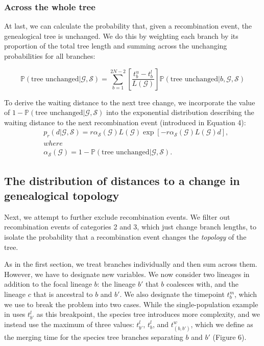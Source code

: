 \documentclass[11pt]{article}
\begin{document}
\subsubsection{Across the whole tree}

At last, we can calculate the probability that, given a recombination event, the genealogical tree is unchanged. We do this by weighting each branch by its proportion of the total tree length and summing across the unchanging probabilities for all branches:

\begin{equation}
	\mathbb{P}(\textrm{tree unchanged} | \mathcal{G},\mathcal{S}) = \sum_{b=1}^{2N-2}\left[\frac{t^u_b-t^l_b}{L(\mathcal{G})}\right]\mathbb{P}(\textrm{tree unchanged} | b,\mathcal{G},\mathcal{S})
\end{equation}

To derive the waiting distance to the next tree change, we incorporate the value of $1-\mathbb{P}(\textrm{tree unchanged} | \mathcal{G},\mathcal{S})$ into the exponential distribution describing the waiting distance to the next recombination event (introduced in Equation 4):
\begin{equation}
\begin{aligned}
	&p_r(d|\mathcal{G},\mathcal{S}) = r\alpha_\mathcal{S}(\mathcal{G})L(\mathcal{G})\exp\left[-r\alpha_\mathcal{S}(\mathcal{G})L(\mathcal{G})d\right]\textrm{,} \\
	&where \\
	&\alpha_\mathcal{S}(\mathcal{G})=1-\mathbb{P}(\textrm{tree unchanged} | \mathcal{G},\mathcal{S}).
\end{aligned}
\end{equation}

\subsection{The distribution of distances to a change in genealogical topology}

Next, we attempt to further exclude recombination events. We filter out recombination events of categories 2 and 3, which just change branch lengths, to isolate the probability that a recombination event changes the \emph{topology} of the tree.

As in the first section, we treat branches individually and then sum across them. However, we have to designate new variables. We now consider two lineages in addition to the focal lineage $b$: the lineage $b'$ that $b$ coalesces with, and the lineage $c$ that is ancestral to $b$ and $b'$. We also designate the timepoint $t_b^m$, which we use to break the problem into two cases. While the single-population example in \citet{deng_distribution_2021} uses $t_{b'}^l$ as this breakpoint, the species tree introduces more complexity, and we instead use the maximum of three values: $t_{b'}^l$, $t_{b}^l$, and $t_{(b,b')}^w$, which we define as the merging time for the species tree branches separating $b$ and $b'$ (Figure 6).
\end{document}
